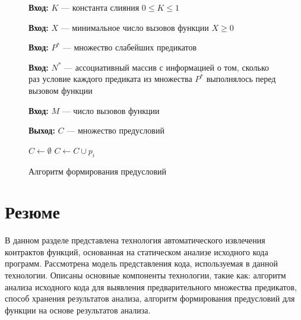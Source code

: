 \begin{figure}[h!]
\textbf{Вход:} $K$ --- константа слияния $0 \le K \le 1$

\textbf{Вход:} $X$ --- минимальное число вызовов функции $X \ge 0$

\textbf{Вход:} $P^*$ --- множество слабейших предикатов

\textbf{Вход:} $N^*$ --- ассоциативный массив с информацией о том, сколько раз условие каждого предиката из множества $P^*$ выполнялось перед вызовом функции

\textbf{Вход:} $M$ --- число вызовов функции

\textbf{Выход:} $C$ --- множество предусловий
\begin{algorithmic}[1]
\State $C \leftarrow \emptyset$
	\State \Return
\EndIf
{}
	\State $C \gets C \cup p_i$
    \EndIf
\EndFor
\end{algorithmic}
\caption{Алгоритм формирования предусловий}
\label{image:extractionAlgoritm}
\end{figure}

\section{Резюме}
В данном разделе представлена технология автоматического извлечения контрактов функций, основанная на статическом анализе исходного кода программ. Рассмотрена модель представления кода, используемая в данной технологии. Описаны основные компоненты технологии, такие как: алгоритм анализа исходного кода для выявления предварительного множества предикатов, способ хранения результатов анализа, алгоритм формирования предусловий для функции на основе результатов анализа.